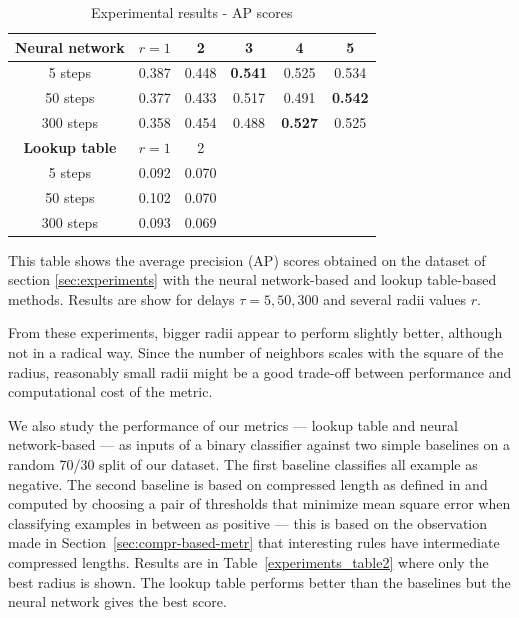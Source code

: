 \begin{table}[t!]
  \renewcommand{\arraystretch}{1}
  \caption{Experimental results - AP scores}
  \label{experiments_table}
  \centering
  \begin{tabular}{c|c|c|c|c|c}
    \toprule
    \bfseries Neural network& $r=1$ &  2  & 3  & 4 & 5\\
    \midrule
    5 steps & 0.387 & 0.448 & \bfseries 0.541 & 0.525 & 0.534\\
    50 steps & 0.377 & 0.433 & 0.517 & 0.491 & \bfseries 0.542\\
    300 steps &0.358 & 0.454 & 0.488 & \bfseries 0.527 & 0.525\\
    \midrule
    \bfseries Lookup table& $r=1$ &  2  & & &\\
    \midrule
    5 steps & 0.092 & 0.070&&&\\
    50 steps & 0.102 & 0.070&&&\\
    300 steps & 0.093 & 0.069&&&\\
    \bottomrule
  \end{tabular}

  \begin{flushleft}{This table shows the average precision (AP)
      scores obtained on the dataset of section \ref{sec:experiments} with the
      neural network-based and lookup table-based methods. Results are show for
      delays $\tau = 5, 50, 300$ and several radii values $r$.}\end{flushleft}
\end{table}

From these experiments, bigger radii appear to perform slightly better, although
not in a radical way. Since the number of neighbors scales with the square of
the radius, reasonably small radii might be a good trade-off between performance
and computational cost of the metric.

We also study the performance of our metrics --- lookup table and neural
network-based --- as inputs of a binary classifier against two simple baselines
on a random 70/30 split of our dataset. The first baseline classifies all
example as negative. The second baseline is based on compressed length as
defined in \parencite{zenilCompressionBasedInvestigationDynamical2010} and computed by choosing a pair
of thresholds that minimize mean square error when classifying examples in
between as positive --- this is based on the observation made in
Section~\ref{sec:compr-based-metr} that interesting rules have intermediate
compressed lengths. Results are in Table~\ref{experiments_table2} where only the
best radius is shown. The lookup table performs better than the baselines but
the neural network gives the best score.

